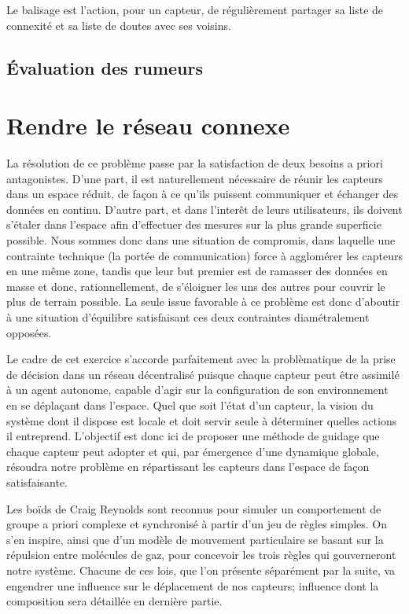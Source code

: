 \documentclass[10pt]{article}
\begin{document}
\begin{multicols}{2}
Le balisage est l'action, pour un capteur, de régulièrement partager
sa liste de connexité et sa liste de doutes avec ses voisins.

\subsection*{\'Evaluation des rumeurs}



\section{Rendre le réseau connexe}

La résolution de ce problème passe par la satisfaction de deux besoins
a priori antagonistes. D'une part, il est naturellement nécessaire de
réunir les capteurs dans un espace réduit, de façon à ce qu'ils
puissent communiquer et échanger des données en continu. D'autre part,
et dans l'interêt de leurs utilisateurs, ils doivent s'étaler dans
l'espace afin d'effectuer des mesures sur la plus grande superficie
possible. Nous sommes donc dans une situation de compromis, dans
laquelle une contrainte technique (la portée de communication) force à
agglomérer les capteurs en une même zone, tandis que leur but premier
est de ramasser des données en masse et donc, rationnellement, de
s'éloigner les uns des autres pour couvrir le plus de terrain
possible. La seule issue favorable à ce problème est donc d'aboutir à
une situation d'équilibre satisfaisant ces deux contraintes
diamétralement opposées.

Le cadre de cet exercice s'accorde parfaitement avec la problèmatique
de la prise de décision dans un réseau décentralisé puisque chaque
capteur peut être assimilé à un agent autonome, capable d'agir sur la
configuration de son environnement en se déplaçant dans l'espace. Quel
que soit l'état d'un capteur, la vision du système dont il dispose est
locale et doit servir seule à déterminer quelles actions il
entreprend. L'objectif est donc ici de proposer une méthode de guidage
que chaque capteur peut adopter et qui, par émergence d'une dynamique
globale, résoudra notre problème en répartissant les capteurs dans
l'espace de façon satisfaisante.

Les boïds de Craig Reynolds \cite{Reynolds1987} sont reconnus pour
simuler un comportement de groupe a priori complexe et synchronisé à
partir d'un jeu de règles simples. On s'en inspire, ainsi que d'un
modèle de mouvement particulaire \cite{Cheng2011497} se basant sur la
répulsion entre molécules de gaz, pour concevoir les trois règles qui
gouverneront notre système. Chacune de ces lois, que l'on présente
séparément par la suite, va engendrer une influence sur le déplacement
de nos capteurs; influence dont la composition sera détaillée en
dernière partie.


\end{multicols}
\end{document}
